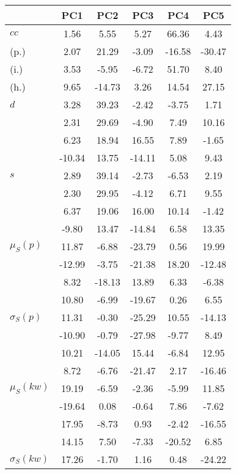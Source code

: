 \begin{table}[h!]
\begin{center}
\begin{tabular}{| l | c | c | c | c | c |}\hline
 & PC1 & PC2 & PC3 & PC4 & PC5 \\\hline
$cc$ & 1.56  & 5.55  & 5.27  & 66.36  & 4.43 \\\hline
(p.) & 2.07  & 21.29  & -3.09  & -16.58  & -30.47 \\\hline
(i.) & 3.53  & -5.95  & -6.72  & 51.70  & 8.40 \\\hline
(h.) & 9.65  & -14.73  & 3.26  & 14.54  & 27.15 \\\hline
$d$ & 3.28  & 39.23  & -2.42  & -3.75  & 1.71 \\\hline
 & 2.31  & 29.69  & -4.90  & 7.49  & 10.16 \\\hline
 & 6.23  & 18.94  & 16.55  & 7.89  & -1.65 \\\hline
 & -10.34  & 13.75  & -14.11  & 5.08  & 9.43 \\\hline
$s$ & 2.89  & 39.14  & -2.73  & -6.53  & 2.19 \\\hline
 & 2.30  & 29.95  & -4.12  & 6.71  & 9.55 \\\hline
 & 6.37  & 19.06  & 16.00  & 10.14  & -1.42 \\\hline
 & -9.80  & 13.47  & -14.84  & 6.58  & 13.35 \\\hline
$\mu_S(p)$ & 11.87  & -6.88  & -23.79  & 0.56  & 19.99 \\\hline
 & -12.99  & -3.75  & -21.38  & 18.20  & -12.48 \\\hline
 & 8.32  & -18.13  & 13.89  & 6.33  & -6.38 \\\hline
 & 10.80  & -6.99  & -19.67  & 0.26  & 6.55 \\\hline
$\sigma_S(p)$ & 11.31  & -0.30  & -25.29  & 10.55  & -14.13 \\\hline
 & -10.90  & -0.79  & -27.98  & -9.77  & 8.49 \\\hline
 & 10.21  & -14.05  & 15.44  & -6.84  & 12.95 \\\hline
 & 8.72  & -6.76  & -21.47  & 2.17  & -16.46 \\\hline
$\mu_S(kw)$ & 19.19  & -6.59  & -2.36  & -5.99  & 11.85 \\\hline
 & -19.64  & 0.08  & -0.64  & 7.86  & -7.62 \\\hline
 & 17.95  & -8.73  & 0.93  & -2.42  & -16.55 \\\hline
 & 14.15  & 7.50  & -7.33  & -20.52  & 6.85 \\\hline
$\sigma_S(kw)$ & 17.26  & -1.70  & 1.16  & 0.48  & -24.22 \\\hline

\end{tabular}
\end{center}
\end{table}
